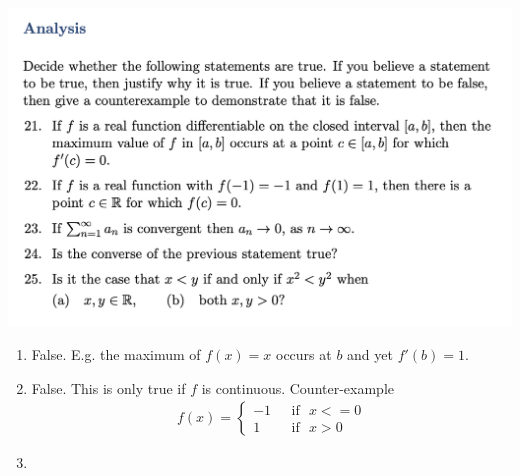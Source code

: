 \includegraphics[width=400pt]{img/ou-entry-efb5.png}

\begin{enumerate}
\item False. E.g. the maximum of $f(x) = x$ occurs at $b$ and yet $f'(b) = 1$.
\item False. This is only true if $f$ is continuous. Counter-example
  \begin{align*}
    f(x) =
    \begin{cases}
      -1 &~~~\text{if}~~~ x <= 0\\
      1 &~~~\text{if}~~~ x > 0
    \end{cases}
  \end{align*}
\item
\end{enumerate}
